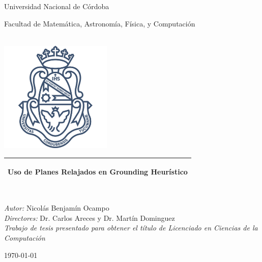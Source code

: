     
\frontmatter

\begin{titlepage}      
    \begin{center}
        {\huge
            Universidad Nacional de Córdoba
            
            \vspace{0.8cm}
            
            Facultad de Matemática, Astronomía, Física, y Computación
        }\\[1cm]
        \includegraphics[width=0.4\textwidth]{./figures/logo_unc.png}
        
        \vspace*{1cm}
        
        \begin{tabular}{@{}p{\textwidth}@{}}
        \toprule[2pt]
        \midrule
        \vspace{0.2cm}
        \begin{center}
        \Huge{\textbf{Uso de Planes Relajados en Grounding Heurístico}}
        \end{center}
        \vspace{0.2cm}\\
        \midrule
        \toprule[2pt]
        \end{tabular}

        \linespread{1}~\\[1cm]

        {\Large
            \emph{Autor:} Nicolás Benjamín Ocampo
        }\\[1cm]
        {\Large
            \emph{Directores:} Dr. Carlos Areces y Dr. Martín Dominguez
        }\\[1cm]
        
        \vfill
        \Large \emph{Trabajo de tesis presentado para obtener el título de
        Licenciado en Ciencias de la Computación}\\[0.3cm] 
        
        \vspace{0.8cm}
        \vspace{0.8cm}
        
        \today
    \end{center}
\end{titlepage}